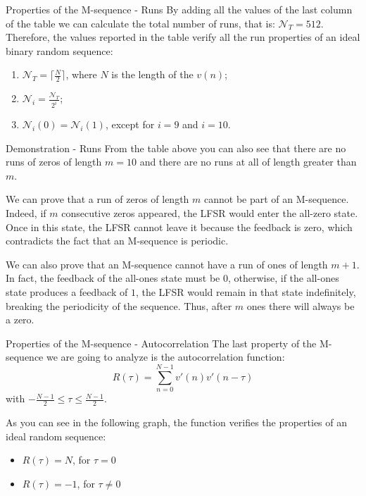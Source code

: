 \begin{frame}{Properties of the M-sequence - Runs}
    By adding all the values of the last column of the table we can calculate the total number of runs, that is: $\mathcal{N}_T = 512$. Therefore, the values reported in the table verify all the run properties of an ideal binary random sequence:

    \begin{enumerate}
        \item $\mathcal{N}_T = \lceil \frac{N}{2} \rceil$, where $N$ is the length of the $v(n)$;
        \item $\mathcal{N}_i = \frac{\mathcal{N}_T}{2^i}$;
        \item $\mathcal{N}_i(0) = \mathcal{N}_i(1)$, except for $i = 9$ and $i = 10$.
    \end{enumerate}
\end{frame}

\begin{frame}{Demonstration - Runs}
    From the table above you can also see that there are no runs of zeros of length $m = 10$ and there are no runs at all of length greater than $m$. 
    
    We can prove that a run of zeros of length $m$ cannot be part of an M-sequence. Indeed, if $m$ consecutive zeros appeared, the LFSR would enter the all-zero state. Once in this state, the LFSR cannot leave it because the feedback is zero, which contradicts the fact that an M-sequence is periodic.

    We can also prove that an M-sequence cannot have a run of ones of length $m+1$. In fact, the feedback of the all-ones state must be $0$, otherwise, if the all-ones state produces a feedback of $1$, the LFSR would remain in that state indefinitely, breaking the periodicity of the sequence. Thus, after $m$ ones there will always be a zero.
\end{frame}

\begin{frame}{Properties of the M-sequence - Autocorrelation}
    The last property of the M-sequence we are going to analyze is the autocorrelation function:
    \[
        R(\tau) = \sum_{n=0}^{N-1}v'(n)v'(n-\tau)
    \]
    with $-\frac{N-1}{2} \le \tau \le \frac{N-1}{2}$.

    As you can see in the following graph, the function verifies the properties of an ideal random sequence:

    \begin{itemize}
        \item $R(\tau) = N$, for $\tau = 0$
        \item $R(\tau) = -1$, for $\tau \ne 0$
    \end{itemize}
\end{frame}

